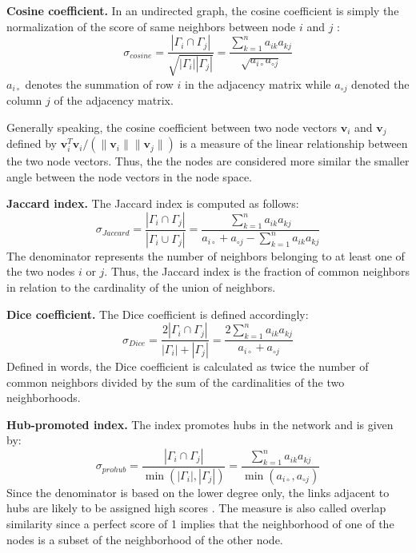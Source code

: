 \textbf{Cosine coefficient.} In an undirected graph, the cosine coefficient is simply the normalization of the score of same neighbors between node $i$ and $j$ \cite{fouss2016algorithms}:
\begin{equation}
    \label{cosine}
    \sigma_{cosine} = \frac{|\Gamma_i \cap \Gamma_j|}{\sqrt{|\Gamma_i||\Gamma_j|}} = \frac{\sum_{k=1}^n a_{ik}a_{kj}}{\sqrt{a_{i \circ }a_{\circ j}}}
\end{equation}
$a_{i \circ }$ denotes the summation of row $i$ in the adjacency matrix while $a_{\circ j}$ denoted the column $j$ of the adjacency matrix.

Generally speaking, the cosine coefficient between two node vectors $\textbf{v}_i$ and $\textbf{v}_j$ defined by $\textbf{v}_i^T\textbf{v}_i/(\|\textbf{v}_i\|\|\textbf{v}_j\|)$ is a measure of the linear relationship between the two node vectors. Thus, the the nodes are considered more similar the smaller angle between the node vectors in the node space.

\textbf{Jaccard index.} The Jaccard index is computed as follows:
\begin{equation}
    \label{jaccard}
    \sigma_{Jaccard} = \frac{|\Gamma_i \cap \Gamma_j|}{|\Gamma_i \cup \Gamma_j|} = \frac{\sum_{k=1}^n a_{ik}a_{kj}}{a_{i \circ }+a_{\circ j}-\sum_{k=1}^n a_{ik}a_{kj}}
\end{equation}
The denominator represents the number of neighbors belonging to at least one of the two nodes $i$ or $j$. Thus, the Jaccard index is the fraction of common neighbors in relation to the cardinality of the union of neighbors. 

\textbf{Dice coefficient.} The Dice coefficient is defined accordingly:
\begin{equation}
    \label{dice}
    \sigma_{Dice} = \frac{2 |\Gamma_i \cap \Gamma_j|}{|\Gamma_i|+|\Gamma_j|}= \frac{2\sum_{k=1}^n a_{ik}a_{kj}}{a_{i \circ }+a_{\circ j}}
\end{equation}
Defined in words, the Dice coefficient is calculated as twice the number of common neighbors divided by the sum of the cardinalities of the two neighborhoods. 

\textbf{Hub-promoted index.} The index promotes hubs in the network and is given by: 
\begin{equation}
    \label{prohub}
    \sigma_{prohub} = \frac{|\Gamma_i \cap \Gamma_j|}{\min(|\Gamma_i|,|\Gamma_j|)} = \frac{\sum_{k=1}^n a_{ik}a_{kj}}{\min(a_{i \circ },a_{\circ j})}
\end{equation}
Since the denominator is based on the lower degree only, the links adjacent to hubs are likely to be assigned high scores \citep{lu2011}. The measure is also called overlap similarity \citep{fouss2016algorithms} since a perfect score of 1 implies that the neighborhood of one of the nodes is a subset of the neighborhood of the other node.

